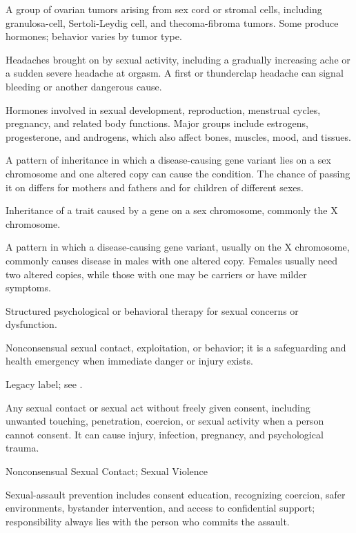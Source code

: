  A group of ovarian tumors arising from sex cord or stromal cells, including granulosa-cell, Sertoli-Leydig cell, and thecoma-fibroma tumors. Some produce hormones; behavior varies by tumor type.

 Headaches brought on by sexual activity, including a gradually increasing ache or a sudden severe headache at orgasm. A first or thunderclap headache can signal bleeding or another dangerous cause.

 Hormones involved in sexual development, reproduction, menstrual cycles, pregnancy, and related body functions. Major groups include estrogens, progesterone, and androgens, which also affect bones, muscles, mood, and tissues.

 A pattern of inheritance in which a disease-causing gene variant lies on a sex chromosome and one altered copy can cause the condition. The chance of passing it on differs for mothers and fathers and for children of different sexes.

 Inheritance of a trait caused by a gene on a sex chromosome, commonly the X chromosome.

 A pattern in which a disease-causing gene variant, usually on the X chromosome, commonly causes disease in males with one altered copy. Females usually need two altered copies, while those with one may be carriers or have milder symptoms.

 Structured psychological or behavioral therapy for sexual concerns or dysfunction.

 Nonconsensual sexual contact, exploitation, or behavior; it is a safeguarding and health emergency when immediate danger or injury exists.

 Legacy label; see .

 Any sexual contact or sexual act without freely given consent, including unwanted touching, penetration, coercion, or sexual activity when a person cannot consent. It can cause injury, infection, pregnancy, and psychological trauma.

\synonyms
Nonconsensual Sexual Contact; Sexual Violence

 Sexual-assault prevention includes consent education, recognizing coercion, safer environments, bystander intervention, and access to confidential support; responsibility always lies with the person who commits the assault.

